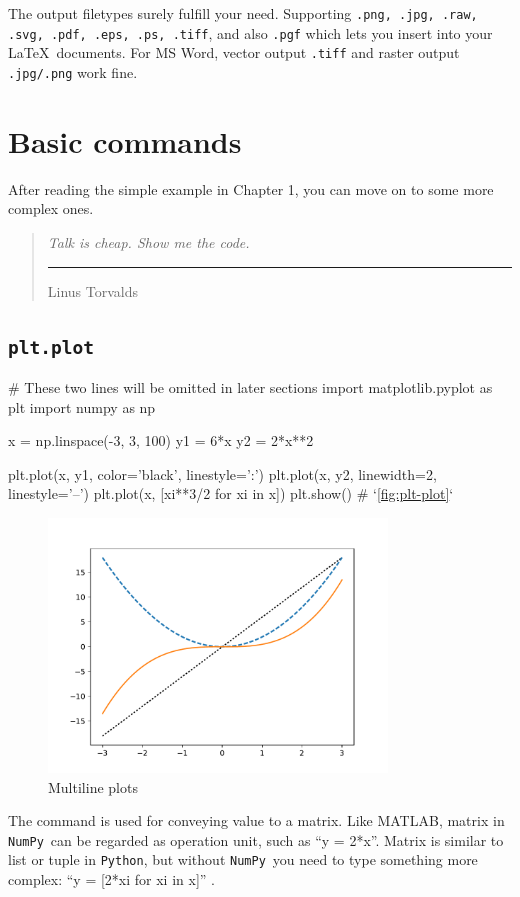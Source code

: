 \documentclass{report}
\newcommand{\pkg}[1]{\texttt{#1}}
\newcommand{\Py}{\pkg{Python}}
\newcommand{\NumPy}{\pkg{NumPy}}
\newcommand{\smallquote}[3][0.8ex]{\begin{quote}
\flushright\emph{#2}\\[#1]
\ttfamily\rule[0.5ex]{2em}{0.8pt} #3\end{quote}}
\begin{document}
The output filetypes surely fulfill your need. Supporting \texttt{.png, .jpg, .raw, .svg, .pdf, .eps, .ps, .tiff}, and also \texttt{.pgf} which lets you insert into your \LaTeX\ documents. For MS Word, vector output \texttt{.tiff} and raster output \texttt{.jpg/.png} work fine.

\chapter{Basic commands}
After reading the simple example in Chapter 1, you can move on to some more complex ones. 

\smallquote{Talk is cheap. Show me the code.}{Linus Torvalds}

\section{\texttt{plt.plot}}

\begin{py}
# These two lines will be omitted in later sections
import matplotlib.pyplot as plt
import numpy as np

x = np.linspace(-3, 3, 100)
y1 = 6*x
y2 = 2*x**2

plt.plot(x, y1, color='black', linestyle=':')
plt.plot(x, y2, linewidth=2, linestyle='--')
plt.plot(x, [xi**3/2 for xi in x])
plt.show() # `\autoref{fig:plt-plot}`
\end{py}

\begin{figure}[!htb]
  \centering
  \includegraphics[width=90mm]{plt-plot}
  \caption{Multiline plots}
  \label{fig:plt-plot}
\end{figure}

The command  is used for conveying value to a matrix. Like MATLAB, matrix in \NumPy\ can be regarded as operation unit, such as ``y = 2*x''. Matrix is similar to list or tuple in \Py , but without \NumPy\ you need to type something more complex: ``y = [2*xi for xi in x]'' .
\end{document}

